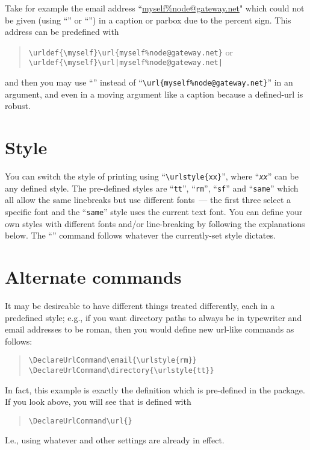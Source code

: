 \documentclass[a4paper]{article}
\begin{document}
Take for example the email address ``\url{myself%node@gateway.net}"
which could not be given (using ``'' or ``'') in a
caption or parbox due to the percent sign.  This address can be
predefined with
\begin{quote}
  \verb|\urldef{\myself}\url{myself%node@gateway.net}| or\\
  \verb+\urldef{\myself}\url|myself%node@gateway.net|+
\end{quote}
and then you may use ``'' instead of
``\verb+\url{myself%node@gateway.net}+''
in an argument, and even in a moving argument like a caption because a
defined-url is robust.

\section{Style}

You can switch the style of printing using ``\verb+\urlstyle{xx}+'',
where ``\emph{\texttt{xx}}'' can be any defined style.  The
pre-defined styles are ``\texttt{tt}'', ``\texttt{rm}'',
``\texttt{sf}'' and ``\texttt{same}'' which all allow the same
linebreaks but use different fonts~--- the first three select a
specific font and the ``\texttt{same}'' style uses the current text
font.  You can define your own styles with different fonts and/or
line-breaking by following the explanations below.  The ``''
command follows whatever the currently-set style dictates.

\section{Alternate commands}

It may be desireable to have different things treated differently, each
in a predefined style; e.g., if you want directory paths to always be
in typewriter and email addresses to be roman, then you would define new
url-like commands as follows:
\begin{quote}
\begin{verbatim}
\DeclareUrlCommand\email{\urlstyle{rm}}
\DeclareUrlCommand\directory{\urlstyle{tt}}
\end{verbatim}
\end{quote}

In fact, this  example is exactly the 
definition which is pre-defined in the package.  If you look above,
you will see that  is defined with
\begin{quote}
\begin{verbatim}
\DeclareUrlCommand\url{}
\end{verbatim}
\end{quote}
I.e., using whatever  and other settings are already in
effect.
\end{document}
